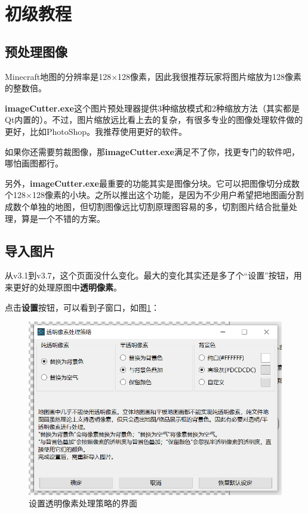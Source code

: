 \documentclass[UTF8]{ctexart}
\begin{document}
\section{初级教程}
\subsection{预处理图像}
Minecraft地图的分辨率是128×128像素，因此我很推荐玩家将图片缩放为128像素的整数倍。

\textbf{imageCutter.exe}这个图片预处理器提供3种缩放模式和2种缩放方法（其实都是Qt内置的）。不过，图片缩放远比看上去的复杂，有很多专业的图像处理软件做的更好，比如PhotoShop。我推荐使用更好的软件。

如果你还需要剪裁图像，那\textbf{imageCutter.exe}满足不了你，找更专门的软件吧，哪怕画图都行。

另外，\textbf{imageCutter.exe}最重要的功能其实是图像分块。它可以把图像切分成数个128×128像素的小块。之所以推出这个功能，是因为不少用户希望把地图画分割成数个单独的地图，但切割图像远比切割原理图容易的多，切割图片结合批量处理，算是一个不错的方案。

\subsection{导入图片}
从v3.1到v3.7，这个页面没什么变化。最大的变化其实还是多了个“设置”按钮，用来更好的处理原图中\textbf{透明像素}。

点击\textbf{设置}按钮，可以看到子窗口，如图\ref*{SetTPS}：

\begin{figure}[htbp]
    \centering
    \includegraphics[width=15cm]{Img1_TPS.png}
    \caption{设置透明像素处理策略的界面}
    \label{SetTPS}
\end{figure}
\end{document}
